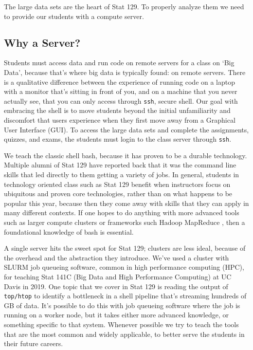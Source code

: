 \documentclass[12pt]{article}
\begin{document}
The large data sets are the heart of Stat 129.
To properly analyze them we need to provide our students with a compute server.


\subsection{Why a Server?}
\label{sec:server}

Students must access data and run code on remote servers for a class on `Big Data', because that's where big data is typically found: on remote servers.
There is a qualitative difference between the experience of running code on a laptop with a monitor that's sitting in front of you, and on a machine that you never actually see, that you can only access through \texttt{ssh}, secure shell.
Our goal with embracing the shell is to move students beyond the initial unfamiliarity and discomfort that users experience when they first move away from a Graphical User Interface (GUI).
To access the large data sets and complete the assignments, quizzes, and exams, the students must login to the class server through \texttt{ssh}.

We teach the classic shell bash, because it has proven to be a durable technology.
Multiple alumni of Stat 129 have reported back that it was the command line skills that led directly to them getting a variety of jobs.
In general, students in technology oriented class such as Stat 129 benefit when instructors focus on ubiquitous and proven core technologies, rather than on what happens to be popular this year, because then they come away with skills that they can apply in many different contexts.
If one hopes to do anything with more advanced tools such as larger compute clusters or frameworks such Hadoop MapReduce \cite{white2012hadoop}, then a foundational knowledge of bash is essential.

A single server hits the sweet spot for Stat 129; clusters are less ideal, because of the overhead and the abstraction they introduce.
We've used a cluster with SLURM \cite{yoo2003slurm} job queueing software, common in high performance computing (HPC), for teaching Stat 141C (Big Data and High Performance Computing) at UC Davis in 2019.
One topic that we cover in Stat 129 is reading the output of \texttt{top/htop} to identify a bottleneck in a shell pipeline that's streaming hundreds of GB of data.
It's possible to do this with job queueing software where the job is running on a worker node, but it takes either more advanced knowledge, or something specific to that system.
Whenever possible we try to teach the tools that are the most common and widely applicable, to better serve the students in their future careers.
\end{document}
